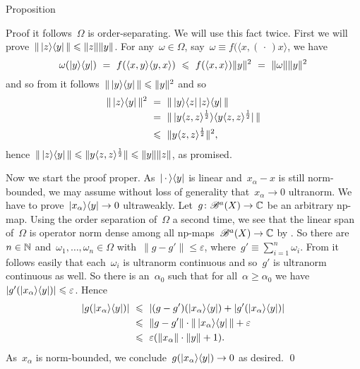 \documentclass[b]{subfiles}
\begin{document}
\begin{parsec}
\begin{point}{Proposition}
\begin{point}{Proof}
    it follows~$\Omega$ is order-separating.
We will use this fact twice.
First we will prove~$\| \left|z\right>\!\left<y\right| \| \leqslant \| z\| \|y\|$.
For any~$\omega \in \Omega$,
    say~$\omega \equiv f(\langle x,(\,\cdot\,) x \rangle$, we have
\begin{equation*}
    \omega(\left|y\right>\!\left<y\right|)
     \ = \ f(\langle x,y \rangle\langle y, x \rangle) 
     \ \leqslant \ f(\langle x, x\rangle) \| y\|^2 
     \ = \ \| \omega \| \| y\|^2
\end{equation*}
and so from  it follows~$\| \left|y\right>\!\left<y\right| \| \leqslant \|y\|^2$
    and so
\begin{align*}
    \| \left|z\right>\!\left<y\right| \|^2
        & \ = \ \| \left|y\right>\!\left<z\right| \left|z\right>\!\left<y\right| \| \\
        & \ = \ \| \left|\smash{y \langle z,z\rangle^{\frac{1}{2}}}\right>\!\left<
\smash{y \langle z,z\rangle^{\frac{1}{2}}}\right| \| \\
        & \ \leqslant \ \| y \langle z,z \rangle^{\frac{1}{2}} \|^2,
\end{align*}
hence~$\| \left|z\right>\!\left<y\right| \| \leqslant \|y \langle z,z\rangle^{\frac{1}{2}} \|
                            \leqslant \|y\|  \|z\|$, as promised.
\begin{point}%
Now we start the proof proper.
As~$\left|\,\cdot\,\right>\!\left<y\right|$ is linear
    and~$x_\alpha - x$ is still norm-bounded,
    we may assume without loss of generality
    that~$x_\alpha \to 0$ ultranorm.
    We have to prove~$\left|x_\alpha\right>\!\left<y\right| \to 0$ ultraweakly.
Let~$g\colon \mathscr{B}^a(X) \to \mathbb{C}$ be an arbitrary np-map.
Using the order separation of~$\Omega$ a second time,
    we see that the linear span of~$\Omega$
    is operator norm dense among  all np-maps~$\mathscr{B}^a(X) \to \mathbb{C}$
    by .
So there are~$n \in \mathbb{N}$ and~$\omega_1, \ldots, \omega_n \in \Omega$
    with~$\| g - g' \| \leq \varepsilon$,
    where~$g' \equiv \sum^n_{i=1} \omega_i$.
From  it follows easily that
    each~$\omega_i$ is ultranorm continuous
        and so~$g'$ is ultranorm continuous as well.
So there is an~$\alpha_0$ such that for all~$\alpha \geq \alpha_0$
    we have~$|g'(\left|x_\alpha\right>\!\left<y\right|)| \leqslant \varepsilon$.
    Hence
\begin{align*}
        | g(\left|x_\alpha\right>\!\left<y\right|) |
            &\ \leqslant\  | (g-g')(\left|x_\alpha\right>\!\left<y\right|)  +
                    | g'(\left|x_\alpha\right>\!\left<y\right|) | \\
            &\ \leqslant\  \|g - g'\| \cdot \| \left|x_\alpha\right>\!\left<y\right| \|  + \varepsilon\\
            &\ \leqslant\  \varepsilon (\| x_\alpha\| \cdot \|y\| + 1).
\end{align*}
    As~$x_\alpha$ is norm-bounded, we conclude~$g(\left|x_\alpha\right>\!\left<y\right|) \to 0$
    as desired. \qed
\end{point}
\end{point}
\end{point}
\end{parsec}
\end{document}
